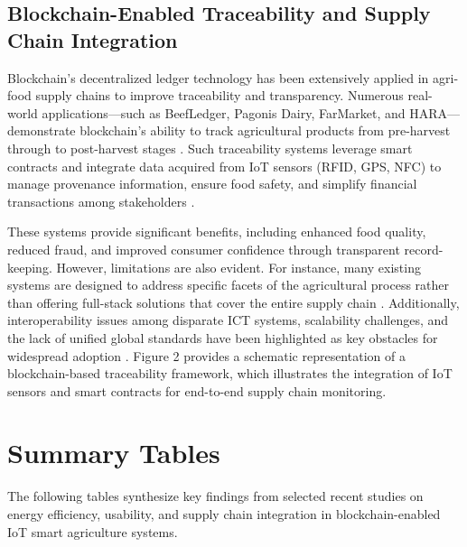 \documentclass[12pt,onecolumn]{IEEEtran} %
\begin{document}
\subsection{Blockchain-Enabled Traceability and Supply Chain Integration}
Blockchain’s decentralized ledger technology has been extensively applied in agri-food supply chains to improve traceability and transparency. Numerous real-world applications—such as BeefLedger, Pagonis Dairy, FarMarket, and HARA—demonstrate blockchain’s ability to track agricultural products from pre-harvest through to post-harvest stages \cite{akella2023asystematicreview, mwewa2024blockchaintechnologya}. Such traceability systems leverage smart contracts and integrate data acquired from IoT sensors (RFID, GPS, NFC) to manage provenance information, ensure food safety, and simplify financial transactions among stakeholders \cite{ellahi2023blockchainbasedframeworksfor, akella2023asystematicreview}.

These systems provide significant benefits, including enhanced food quality, reduced fraud, and improved consumer confidence through transparent record-keeping. However, limitations are also evident. For instance, many existing systems are designed to address specific facets of the agricultural process rather than offering full-stack solutions that cover the entire supply chain \cite{akella2023asystematicreview}. Additionally, interoperability issues among disparate ICT systems, scalability challenges, and the lack of unified global standards have been highlighted as key obstacles for widespread adoption \cite{akella2023asystematicreview}. Figure 2 \cite{sakthivel2024enhancingtransparencyand} provides a schematic representation of a blockchain-based traceability framework, which illustrates the integration of IoT sensors and smart contracts for end-to-end supply chain monitoring.

\section{Summary Tables}
The following tables synthesize key findings from selected recent studies on energy efficiency, usability, and supply chain integration in blockchain-enabled IoT smart agriculture systems.
\end{document}
